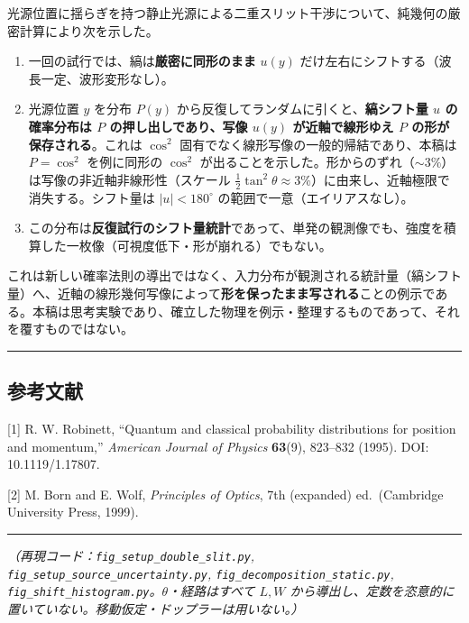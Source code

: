 \documentclass[
]{ltjsarticle}
\providecommand{\tightlist}{%
  \setlength{\itemsep}{0pt}\setlength{\parskip}{0pt}}
\begin{document}
光源位置に揺らぎを持つ静止光源による二重スリット干渉について、純幾何の厳密計算により次を示した。

\begin{enumerate}
\def\labelenumi{\arabic{enumi}.}
\tightlist
\item
  一回の試行では、縞は\textbf{厳密に同形のまま} \(u(y)\)
  だけ左右にシフトする（波長一定、波形変形なし）。
\item
  光源位置 \(y\) を分布 \(P(y)\)
  から反復してランダムに引くと、\textbf{縞シフト量 \(u\) の確率分布は
  \(P\) の押し出しであり、写像 \(u(y)\) が近軸で線形ゆえ \(P\)
  の形が保存される}。これは \(\cos^2\)
  固有でなく線形写像の一般的帰結であり、本稿は \(P=\cos^2\) を例に同形の
  \(\cos^2\)
  が出ることを示した。形からのずれ（\(\sim3\%\)）は写像の非近軸非線形性（スケール
  \(\tfrac12\tan^2\theta\approx3\%\)）に由来し、近軸極限で消失する。シフト量は
  \(|u|<180^\circ\) の範囲で一意（エイリアスなし）。
\item
  この分布は\textbf{反復試行のシフト量統計}であって、単発の観測像でも、強度を積算した一枚像（可視度低下・形が崩れる）でもない。
\end{enumerate}

これは新しい確率法則の導出ではなく、入力分布が観測される統計量（縞シフト量）へ、近軸の線形幾何写像によって\textbf{形を保ったまま写される}ことの例示である。本稿は思考実験であり、確立した物理を例示・整理するものであって、それを覆すものではない。

\begin{center}\rule{0.5\linewidth}{0.5pt}\end{center}

\subsection{参考文献}\label{ux53c2ux8003ux6587ux732e}

{[}1{]} R. W. Robinett, ``Quantum and classical probability
distributions for position and momentum,'' \emph{American Journal of
Physics} \textbf{63}(9), 823--832 (1995). DOI: 10.1119/1.17807.

{[}2{]} M. Born and E. Wolf, \emph{Principles of Optics}, 7th (expanded)
ed.~(Cambridge University Press, 1999).

\begin{center}\rule{0.5\linewidth}{0.5pt}\end{center}

\emph{（再現コード：\texttt{fig\_setup\_double\_slit.py},
\texttt{fig\_setup\_source\_uncertainty.py},
\texttt{fig\_decomposition\_static.py},
\texttt{fig\_shift\_histogram.py}。\(\theta\)・経路はすべて \(L,W\)
から導出し、定数を恣意的に置いていない。移動仮定・ドップラーは用いない。）}
\end{document}
